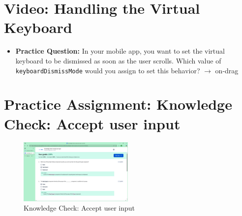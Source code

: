 \section{Video: Handling the Virtual Keyboard}
\begin{itemize}
    \item \textbf{Practice Question:} In your mobile app, you want to set the virtual keyboard to be dismissed as soon as the user scrolls. Which value of \texttt{keyboardDismissMode} would you assign to set this behavior?   
    $\rightarrow$ on-drag
\end{itemize}

\section{Practice Assignment: Knowledge Check: Accept user input}
\begin{figure}[H]
    \centering
    \includegraphics[width=0.5\textwidth]{images/kc-3.png}
    \caption{Knowledge Check: Accept user input}
\end{figure}